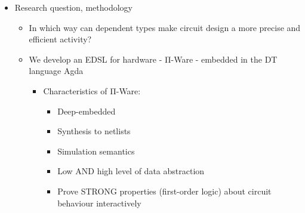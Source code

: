 
    \begin{itemize}
        \item Research question, methodology
        \begin{itemize}
            \item In which way can dependent types make circuit design a more precise and efficient activity?
            \item We develop an EDSL for hardware - Π-Ware - embedded in the DT language Agda
            \begin{itemize}
                \item Characteristics of Π-Ware:
                \begin{itemize}
                    \item Deep-embedded
                    \item Synthesis to netlists
                    \item Simulation semantics
                    \item Low AND high level of data abstraction
                    \item Prove STRONG properties (first-order logic) about circuit behaviour interactively
                \end{itemize}
            \end{itemize}
        \end{itemize}
    \end{itemize}
